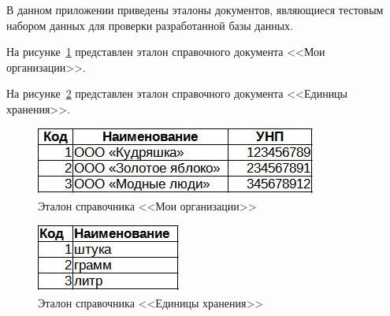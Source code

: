 \documentclass[12pt, a4paper, simple]{eskdtext}
\begin{document}
    

    \thispagestyle{plain}
    \pagestyle{plain}
    \hspace{0pt}

    В данном приложении приведены эталоны документов,
    являющиеся тестовым набором данных для проверки разработанной базы данных.

    На рисунке~\ref{fig:CP_MoiOrg_etalon} представлен эталон справочного документа <<Мои организации>>.

    На рисунке~\ref{fig:CP_EdHran_etalon} представлен эталон справочного документа <<Единицы хранения>>.

    \begin{figure}[!h]
        \centering
        \includegraphics[]
            {_docs/СП_МоиОрг_эталон.jpg}
        \caption{Эталон справочника <<Мои организации>>}
        \label{fig:CP_MoiOrg_etalon}
    \end{figure}

    \begin{figure}[!h]
        \centering
        \includegraphics[]
            {_docs/СП_ЕдХран_эталон.jpg}
        \caption{Эталон справочника <<Единицы хранения>>}
        \label{fig:CP_EdHran_etalon}
    \end{figure}
\end{document}
